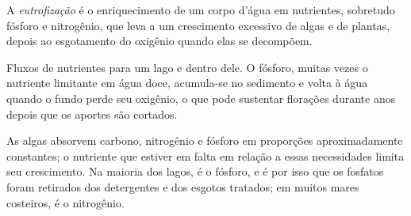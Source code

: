 \begin{definition}[Eutrofização]\label{def:b3:environmental-toxicology:eutrophication}
A \emph{eutrofização} é o enriquecimento de um corpo d'água
em nutrientes, sobretudo fósforo e nitrogênio, que leva a um crescimento excessivo de
algas e de plantas, depois ao esgotamento do oxigênio quando elas se decompõem.
\end{definition}

\begin{omfigure}

{\small Fluxos de nutrientes para um lago e dentro dele. O fósforo, muitas vezes o nutriente
limitante em água doce, acumula-se no sedimento e volta à água
quando o fundo perde seu oxigênio, o que pode sustentar florações durante anos depois que os
aportes são cortados.}
\end{omfigure}

As algas absorvem carbono, nitrogênio e fósforo em proporções aproximadamente constantes;
o nutriente que estiver em falta em relação a essas necessidades limita seu crescimento. Na
maioria dos lagos, é o fósforo, e é por isso que os fosfatos foram retirados dos
detergentes e dos esgotos tratados; em muitos mares costeiros, é o nitrogênio.

